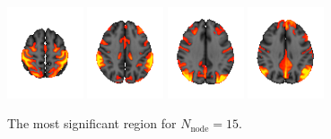 \documentclass[11pt]{article}
\begin{document}
\begin{figure}[H]
    \centering
    \includegraphics[width=0.2\textwidth]{../Analysis/MIR/groupICA/groupICA_3T_HCP1200_MSMAll_d15.ica/0010.png}
    \includegraphics[width=0.2\textwidth]{../Analysis/MIR/groupICA/groupICA_3T_HCP1200_MSMAll_d15.ica/0005.png}
    \includegraphics[width=0.2\textwidth]{../Analysis/MIR/groupICA/groupICA_3T_HCP1200_MSMAll_d15.ica/0008.png}
    \includegraphics[width=0.2\textwidth]{../Analysis/MIR/groupICA/groupICA_3T_HCP1200_MSMAll_d15.ica/0001.png}
    \caption{The most significant region for $N_{\text{node}} = 15$.}
    \label{msr-n-15}
\end{figure}
\end{document}
